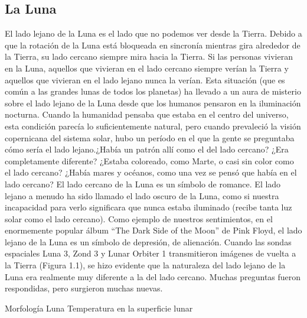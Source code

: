\documentclass[12pt]{article}
\begin{document}
\subsection{La Luna}
El lado lejano de la Luna es el lado que no podemos ver desde la Tierra. Debido a que la rotación de 
la Luna está bloqueada en sincronía mientras gira alrededor de la Tierra, su lado cercano siempre 
mira hacia la Tierra. Si las personas vivieran en la Luna, aquellos que vivieran en el lado cercano 
siempre verían la Tierra y aquellos que vivieran en el lado lejano nunca la verían.
Esta situación (que es común a las grandes lunas de todos los planetas) ha llevado a un aura de 
misterio sobre el lado lejano de la Luna desde que los humanos pensaron en la iluminación nocturna. 
Cuando la humanidad pensaba que estaba en el centro del universo, esta condición parecía lo 
suficientemente natural, pero cuando prevaleció la visión copernicana del sistema solar, hubo un 
período en el que la gente se preguntaba cómo sería el lado lejano.¿Había un patrón allí como el del 
lado cercano? ¿Era completamente diferente? ¿Estaba coloreado, como Marte, o casi sin color como el 
lado cercano? ¿Había mares y océanos, como una vez se pensó que había en el lado cercano?
El lado cercano de la Luna es un símbolo de romance. El lado lejano a menudo ha sido llamado el 
lado oscuro de la Luna, como si nuestra incapacidad para verlo significara que nunca estaba iluminado 
(recibe tanta luz solar como el lado cercano). Como ejemplo de nuestros sentimientos, en el 
enormemente popular álbum “The Dark Side of the Moon” de Pink Floyd, el lado lejano de la Luna es 
un símbolo de depresión, de alienación. Cuando las sondas espaciales Luna 3, Zond 3 y Lunar Orbiter 
1 transmitieron imágenes de vuelta a la Tierra (Figura 1.1), se hizo evidente que la naturaleza del 
lado lejano de la Luna era realmente muy diferente a la del lado cercano. Muchas preguntas fueron 
respondidas, pero surgieron muchas nuevas.

Morfología Luna \parencite{PhysicsandAstronomyMoon}
Temperatura en la superficie lunar \parencite{Zhengling2024}
\end{document}
